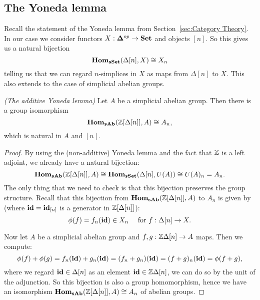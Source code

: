 \subsection{The Yoneda lemma}
Recall the statement of the Yoneda lemma from Section~\ref{sec:Category Theory}. In our case we consider functors $X: \mathbf{\Delta}^{op} \to \mathbf{Set}$ and objects $[n]$. So this gives us a natural bijection
$$ \mathbf{Hom}_{\mathbf{sSet}}(\Delta[n], X) \cong X_n $$
telling us that we can regard $n$-simplices in $X$ as maps from $\Delta[n]$ to $X$. This also extends to the case of simplicial abelian groups.
\begin{lemma}\emph{(The additive Yoneda lemma)}
	Let $A$ be a simplicial abelian group. Then there is a group isomorphism
	$$ \mathbf{Hom}_{\mathbf{sAb}}(\mathbb{Z}[\Delta[n]], A) \cong A_n, $$
	which is natural in $A$ and $[n]$.
\end{lemma}
\begin{proof}
	By using the (non-additive) Yoneda lemma and the fact that $\mathbb{Z}$ is a left adjoint, we already have a natural bijection:
	$$ \mathbf{Hom}_{\mathbf{sAb}}(\mathbb{Z}[\Delta[n]], A) \cong \mathbf{Hom}_{\mathbf{sSet}}(\Delta[n], U(A)) \cong U(A)_n = A_n. $$
	The only thing that we need to check is that this bijection preserves the group structure. Recall that this bijection from $\mathbf{Hom}_{\mathbf{sAb}}(\mathbb{Z}[\Delta[n]], A)$ to $A_n$ is given by (where $\mathbf{id} = \mathbf{id}_{[n]}$ is a generator in $\mathbb{Z}[\Delta[n]]$):
	$$ \phi(f) = f_n(\mathbf{id}) \in X_n \quad\text{ for } f: \Delta[n] \to X. $$

	Now let $A$ be a simplicial abelian group and $f, g: \mathbb{Z}\Delta[n] \to A$ maps. Then we compute:
	$$ \phi(f) + \phi(g) = f_n(\mathbf{id}) + g_n(\mathbf{id}) = (f_n + g_n)(\mathbf{id}) = (f+g)_n(\mathbf{id}) = \phi(f+g), $$
	where we regard $\mathbf{id} \in \Delta[n]$ as an element $\mathbf{id} \in \mathbb{Z}\Delta[n]$, we can do so by the unit of the adjunction. So this bijection is also a group homomorphism, hence we have an isomorphism $\mathbf{Hom}_{\mathbf{sAb}}(\mathbb{Z}[\Delta[n]], A) \cong A_n$ of abelian groups.
\end{proof}

